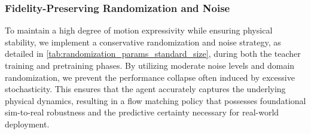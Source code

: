 \subsubsection{Fidelity-Preserving Randomization and Noise}
To maintain a high degree of motion expressivity while ensuring physical stability, we implement a conservative randomization and noise strategy, as detailed in \cref{tab:randomization_params_standard_size}, during both the teacher training and pretraining phases. By utilizing moderate noise levels and domain randomization, we prevent the performance collapse often induced by excessive stochasticity. This ensures that the agent accurately captures the underlying physical dynamics, resulting in a flow matching policy that possesses foundational sim-to-real robustness and the predictive certainty necessary for real-world deployment.

% 


